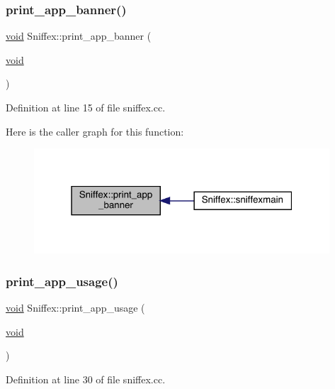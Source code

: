 \subsubsection{\texorpdfstring{print\+\_\+app\+\_\+banner()}{print\_app\_banner()}}
{\footnotesize\ttfamily \mbox{\hyperlink{glad_8h_a950fc91edb4504f62f1c577bf4727c29}{void}} Sniffex\+::print\+\_\+app\+\_\+banner (\begin{DoxyParamCaption}\item[{\mbox{\hyperlink{glad_8h_a950fc91edb4504f62f1c577bf4727c29}{void}}}]{ }\end{DoxyParamCaption})}



Definition at line 15 of file sniffex.\+cc.

Here is the caller graph for this function\+:\nopagebreak
\begin{figure}[H]
\begin{center}
\leavevmode
\includegraphics[width=313pt]{class_sniffex_ab32951f576e7cd62caf4fe1c5b085b4e_icgraph}
\end{center}
\end{figure}
\mbox{\label{class_sniffex_aea81794fe2ac6e2b857eef01c3b109e5}} 
\subsubsection{\texorpdfstring{print\+\_\+app\+\_\+usage()}{print\_app\_usage()}}
{\footnotesize\ttfamily \mbox{\hyperlink{glad_8h_a950fc91edb4504f62f1c577bf4727c29}{void}} Sniffex\+::print\+\_\+app\+\_\+usage (\begin{DoxyParamCaption}\item[{\mbox{\hyperlink{glad_8h_a950fc91edb4504f62f1c577bf4727c29}{void}}}]{ }\end{DoxyParamCaption})}



Definition at line 30 of file sniffex.\+cc.

